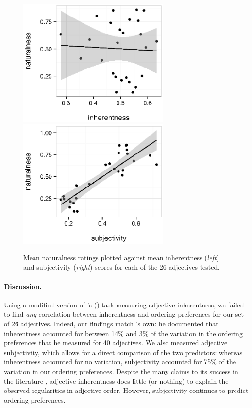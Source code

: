 \documentclass[12pt]{article}
\begin{document}
\renewcommand\thefigure{S.\arabic{figure}}
\begin{figure}
	\centering\includegraphics[width=3in]{plots/expt1-inherentness-naturalness.eps}\includegraphics[width=3in]{plots/expt1-subjectivity2-naturalness.eps}
	\caption{Mean naturalness ratings plotted against mean inherentness (\emph{left}) and subjectivity (\emph{right}) scores for each of the 26 adjectives tested.}\label{fig:inherentness}
\end{figure}

\paragraph{Discussion.} Using a modified version of \citeauthor{martin1969}'s (\citeyear{martin1969}) task measuring adjective inherentness, we failed to find \emph{any} correlation between inherentness and ordering preferences for our set of 26 adjectives. Indeed, our findings match \citeauthor{martin1969}'s own: he documented that inherentness accounted for between 14\% and 3\% of the variation in the ordering preferences that he measured for 40 adjectives. We also measured adjective subjectivity, which allows for a direct comparison of the two predictors: whereas inherentness accounted for no variation, subjectivity accounted for 75\% of the variation in our ordering preferences. Despite the many claims to its success in the literature \citep[e.g.,][]{sweet1898,whorf1945,kemmerer2000}, adjective inherentness does little (or nothing) to explain the observed regularities in adjective order. However, subjectivity continues to predict ordering preferences.
\end{document}
